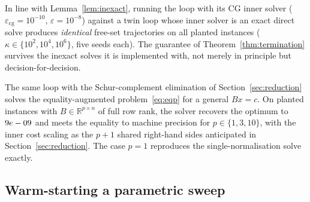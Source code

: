 In line with Lemma~\ref{lem:inexact}, running the loop with its
CG inner solver ($\varepsilon_{\mathrm{cg}} = 10^{-10}$, $\varepsilon = 10^{-8}$) against a
twin loop whose inner solver is an exact direct solve produces \emph{identical} free-set
trajectories on all \nncgTrajTotal{} planted instances
($\kappa \in \{10^2, 10^4, 10^6\}$, five seeds each). The guarantee of
Theorem~\ref{thm:termination} survives the inexact solves it is implemented with, not merely
in principle but decision-for-decision.


The same loop with the Schur-complement elimination of
Section~\ref{sec:reduction} solves the equality-augmented problem~\eqref{eq:eqp} for a general
$Bx = c$. On planted instances with $B \in \mathbb{R}^{p\times n}$ of full row rank, the solver
recovers the optimum to $9e-09$ and meets the equality to machine precision for
$p \in \{1, 3, 10\}$, with the inner cost scaling as the $p+1$ shared right-hand sides
anticipated in Section~\ref{sec:reduction}. The case $p=1$ reproduces the single-normalisation
solve exactly.

\subsection{Warm-starting a parametric sweep}\label{ssec:frontier}


